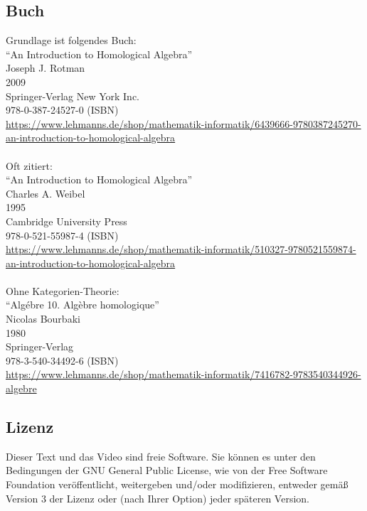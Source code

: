\documentclass[a4paper]{amsart}
\theoremstyle{definition}
\begin{document}
\subsection*{Buch}
Grundlage ist folgendes Buch:\\
"`An Introduction to Homological Algebra"'\\
Joseph J. Rotman\\
2009\\
Springer-Verlag New York Inc.\\
978-0-387-24527-0 (ISBN)\\
{\tiny
   \url{https://www.lehmanns.de/shop/mathematik-informatik/6439666-9780387245270-an-introduction-to-homological-algebra}}\\
\\
Oft zitiert:\\
"`An Introduction to Homological Algebra"'\\
Charles A. Weibel\\
1995\\
Cambridge University Press\\
978-0-521-55987-4 (ISBN)\\
{\tiny
   \url{https://www.lehmanns.de/shop/mathematik-informatik/510327-9780521559874-an-introduction-to-homological-algebra}}\\
\\
Ohne Kategorien-Theorie:\\
"`Algébre 10. Algèbre homologique"'\\
Nicolas Bourbaki\\
1980\\
Springer-Verlag \\
978-3-540-34492-6 (ISBN)\\
{\tiny
   \url{https://www.lehmanns.de/shop/mathematik-informatik/7416782-9783540344926-algebre}}

\subsection*{Lizenz}
Dieser Text und das Video sind freie Software. Sie können es unter den Bedingungen der
GNU General Public License, wie von der Free Software Foundation veröffentlicht, weitergeben
und/oder modifizieren, entweder gemäß Version 3 der Lizenz oder (nach Ihrer Option) jeder späteren Version.
\end{document}

